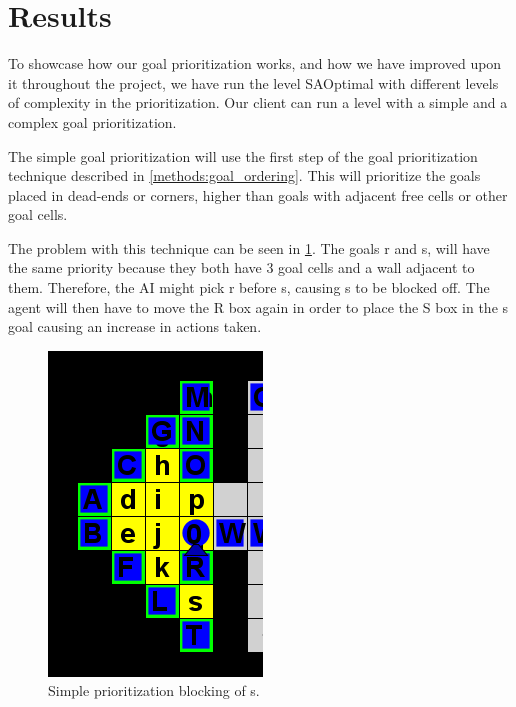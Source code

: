\section{Results}
\label{sec:results}


To showcase how our goal prioritization works, and how we have improved upon it throughout the project, we have run the level SAOptimal with different levels of complexity in the prioritization.
Our client can run a level with a simple and a complex goal prioritization. 

The simple goal prioritization will use the first step of the goal prioritization technique described in \cref{methods:goal_ordering}. 
This will prioritize the goals placed in dead-ends or corners, higher than goals with adjacent free cells or other goal cells.

The problem with this technique can be seen in \cref{fig:SAOptimal}. 
The goals r and s, will have the same priority because they both have 3 goal cells and a wall adjacent to them. 
Therefore, the AI might pick r before s, causing s to be blocked off. 
The agent will then have to move the R box again in order to place the S box in the s goal causing an increase in actions taken.

\begin{figure}[h!]
  \centering
  \includegraphics[width=.5\columnwidth]{graphics/simple_priority_block.PNG}
  \caption{\label{fig:SAOptimal}Simple prioritization blocking of s.}
\end{figure}

